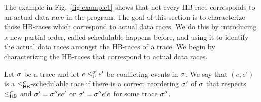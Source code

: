 
The example in Fig.~\ref{fig:example1} shows that not every HB-race
corresponds to an actual data race in the program. The goal of this
section is to characterize those HB-races which correspond to actual
data races. We do this by introducing a new partial order, called
schedulable happens-before, and using it to identify the actual data
races amongst the HB-races of a trace. We begin by characterizing the
HB-races that correspond to actual data races.
%
\begin{definition}
\label{def:hb-sched-race}
Let $\sigma$ be a trace and let $e \leq^{\sigma}_{\mathsf{tr}} e'$ be conflicting events in $\sigma$.
We say that $(e,e')$ is a $\leq^{\sigma}_{\mathsf{HB}}$-schedulable race if there is a correct
reordering $\sigma'$ of $\sigma$ that respects $\leq^{\sigma}_{\mathsf{HB}}$ and $\sigma' = \sigma''
ee'$ or $\sigma' = \sigma'' e'e$ for some trace $\sigma''$. 
%
\end{definition}

